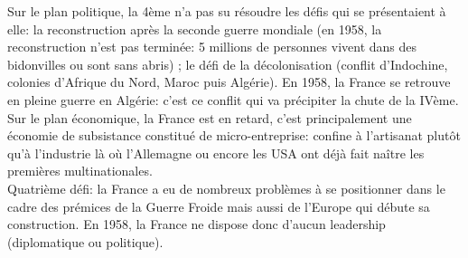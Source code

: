 \documentclass[12pt, a4paper, openany]{book}
\begin{document}
Sur le plan politique, la 4ème n'a pas su résoudre les défis qui se présentaient à elle: la reconstruction après la seconde guerre mondiale (en 1958, la reconstruction n'est pas terminée: 5 millions de personnes vivent dans des bidonvilles ou sont sans abris) ; le défi de la décolonisation (conflit d'Indochine, colonies d'Afrique du Nord, Maroc puis Algérie). En 1958, la France se retrouve en pleine guerre en Algérie: c'est ce conflit qui va précipiter la chute de la IVème. \\
Sur le plan économique, la France est en retard, c'est principalement une économie de subsistance constitué de micro-entreprise: confine à l'artisanat plutôt qu'à l'industrie là où l'Allemagne ou encore les USA ont déjà fait naître les premières multinationales. \\
Quatrième défi: la France a eu de nombreux problèmes à se positionner dans le cadre des prémices de la Guerre Froide mais aussi de l'Europe qui débute sa construction. En 1958, la France ne dispose donc d'aucun leadership (diplomatique ou politique).
\end{document}
